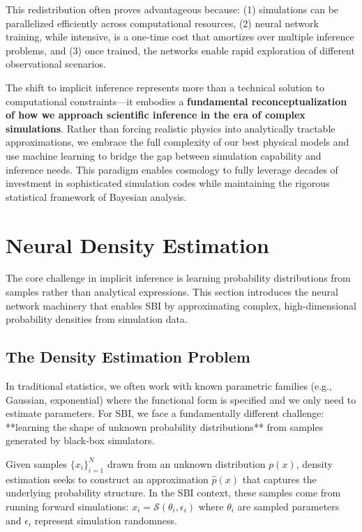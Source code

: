 \documentclass[11pt,a4paper]{article}
\theoremstyle{definition}
\begin{document}
This redistribution often proves advantageous because: (1) simulations can be parallelized efficiently across computational resources, (2) neural network training, while intensive, is a one-time cost that amortizes over multiple inference problems, and (3) once trained, the networks enable rapid exploration of different observational scenarios.

\bigskip

The shift to implicit inference represents more than a technical solution to computational constraints—it embodies a \textbf{fundamental reconceptualization of how we approach scientific inference in the era of complex simulations}. Rather than forcing realistic physics into analytically tractable approximations, we embrace the full complexity of our best physical models and use machine learning to bridge the gap between simulation capability and inference needs. This paradigm enables cosmology to fully leverage decades of investment in sophisticated simulation codes while maintaining the rigorous statistical framework of Bayesian analysis.

\section{Neural Density Estimation}

The core challenge in implicit inference is learning probability distributions from samples rather than analytical expressions. This section introduces the neural network machinery that enables SBI by approximating complex, high-dimensional probability densities from simulation data.

\subsection{The Density Estimation Problem}

In traditional statistics, we often work with known parametric families (e.g., Gaussian, exponential) where the functional form is specified and we only need to estimate parameters. For SBI, we face a fundamentally different challenge: **learning the shape of unknown probability distributions** from samples generated by black-box simulators.

Given samples $\{x_i\}_{i=1}^N$ drawn from an unknown distribution $p(x)$, density estimation seeks to construct an approximation $\hat{p}(x)$ that captures the underlying probability structure. In the SBI context, these samples come from running forward simulations: $x_i = \mathcal{S}(\theta_i, \epsilon_i)$ where $\theta_i$ are sampled parameters and $\epsilon_i$ represent simulation randomness.
\end{document}
